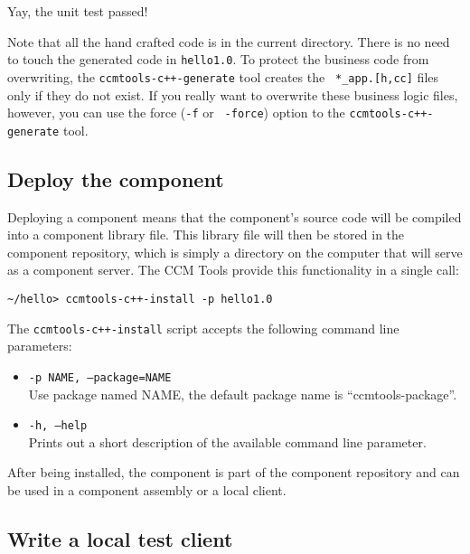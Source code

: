 Yay, the unit test passed!

Note that all the hand crafted code is in the current directory. There is no
need to touch the generated code in {\tt hello1.0}. To protect the business code
from overwriting, the {\tt ccmtools-c++-generate} tool creates the {\tt
*\_app.[h,cc]} files only if they do not exist. If you really want to overwrite
these business logic files, however, you can use the force ({\tt -f} or {\tt
-\-force}) option to the {\tt ccmtools-c++-generate} tool.

\subsection{Deploy the component}

Deploying a component means that the component's source code will be compiled
into a component library file. This library file will then be stored in the
component repository, which is simply a directory on the computer that will
serve as a component server. The CCM Tools provide this functionality in a
single call:

\begin{small}
\begin{verbatim}
~/hello> ccmtools-c++-install -p hello1.0
\end{verbatim}
\end{small}

The {\tt ccmtools-c++-install} script accepts the following command line
parameters:
\begin{itemize}
\item {\tt -p NAME, --package=NAME}\\
Use package named NAME, the default package name is ``ccmtools-package''.

\item {\tt -h, --help}\\
Prints out a short description of the available command line parameter.
\end{itemize}

After being installed, the component is part of the component repository and can
be used in a component assembly or a local client.

\subsection{Write a local test client}

